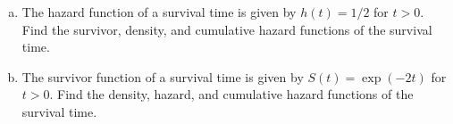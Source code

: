 \documentclass[12pt]{elegantbook}
\begin{document}
    \begin{solution}
    \end{solution}

    \begin{exercise}
        \begin{enumerate}[(a)]
            \item The hazard function of a survival time is given by $h(t) = 1/2$ for $t > 0$. Find the survivor, density, and cumulative hazard functions of the survival time. 
            \item The survivor function of a survival time is given by $S(t) = \exp(-2t)$ for $t > 0$. Find the density, hazard, and cumulative hazard functions of the survival time. 
        \end{enumerate}
    \end{exercise}

    \begin{solution}
    \end{solution}
    
\end{document}
